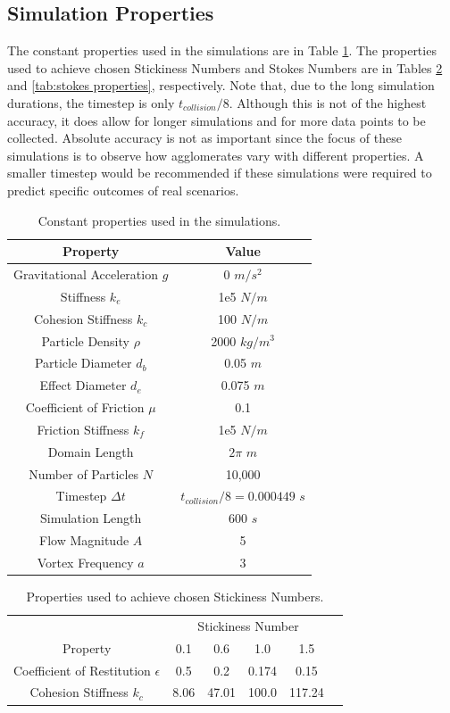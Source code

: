 \documentclass[a4paper,11pt,titlepage]{report}
\begin{document}
\subsection{Simulation Properties}
The constant properties used in the simulations are in Table \ref{tab:simulation properties}. The properties used to achieve chosen Stickiness Numbers and Stokes Numbers are in Tables \ref{tab:stickiness properties} and \ref{tab:stokes properties}, respectively. Note that, due to the long simulation durations, the timestep is only $t_{collision} / 8$. Although this is not of the highest accuracy, it does allow for longer simulations and for more data points to be collected. Absolute accuracy is not as important since the focus of these simulations is to observe how agglomerates vary with different properties. A smaller timestep would be recommended if these simulations were required to predict specific outcomes of real scenarios.
\begin{table}[!htb]
\centering
\begin{tabular}{| c c |}
\hline
Property & Value\\
\hline
Gravitational Acceleration $g$ & 0 $m/s^2$ \\
Stiffness $k_e$ & 1e5 $N/m$ \\
Cohesion Stiffness $k_c$ & 100 $N/m$ \\
Particle Density $\rho$ & 2000 $kg/m^3$ \\
Particle Diameter $d_b$ & 0.05 $m$ \\
Effect Diameter $d_e$ & 0.075 $m$ \\
Coefficient of Friction $\mu$ & 0.1 \\
Friction Stiffness $k_f$ & 1e5 $N/m$ \\
Domain Length & $2\pi$ $m$ \\
Number of Particles $N$ & 10,000 \\
Timestep $\Delta t$ & $t_{collision} / 8 = 0.000449$ $s$ \\
Simulation Length & 600 $s$ \\
Flow Magnitude $A$ & 5 \\
Vortex Frequency $a$ & 3 \\
\hline
\end{tabular}
\caption{Constant properties used in the simulations.}
\label{tab:simulation properties}
\end{table}
\begin{table}[!htb]
\centering
\begin{tabular}{| c c c c c c |}
\hline
& \multicolumn{4}{c}{Stickiness Number} &\\
Property & 0.1 & 0.6 & 1.0 & 1.5 & \\
\hline
Coefficient of Restitution $\epsilon$ & 0.5 & 0.2 & 0.174 & 0.15 & \\
Cohesion Stiffness $k_c$ & 8.06 & 47.01 & 100.0 & 117.24 & \\
\hline
\end{tabular}
\caption{Properties used to achieve chosen Stickiness Numbers.}
\label{tab:stickiness properties}
\end{table}
\end{document}
